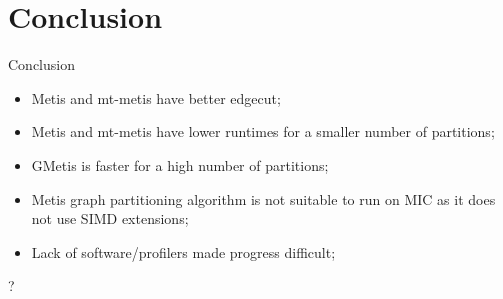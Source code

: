 \documentclass{beamer}
\begin{document}

\section{Conclusion}

\begin{frame}{Conclusion}
\begin{itemize}
  \item Metis and mt-metis have better edgecut;
  \item Metis and mt-metis have lower runtimes for a smaller number of partitions;
  \item GMetis is faster for a high number of partitions;
  \item Metis graph partitioning algorithm is not suitable to run on MIC as it does not use SIMD extensions;
  \item Lack of software/profilers made progress difficult;
\end{itemize}
\end{frame}




\begin{frame}
  \titlepage
  \begin{center}
  \huge ?
  \end{center}
\end{frame}
\end{document}
